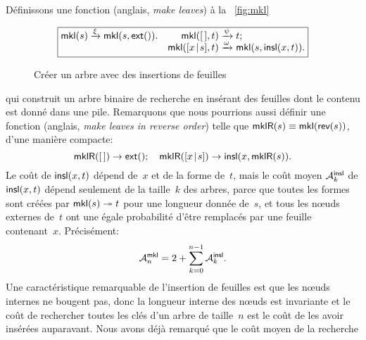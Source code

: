 \hspace*{-3pt} Définissons une fonction 
 (anglais, \emph{make leaves}) à la
\fig~\vref{fig:mkl}
\begin{figure}
\begin{equation*}
\boxed{
\begin{array}{@{}r@{\;}l@{\;}lr@{\;}l@{\;}l@{}}
  \fun{mkl}(s) & \xrightarrow{\smash{\xi}} & \fun{mkl}(s,\fun{ext}()).
& \fun{mkl}(\el,t) & \xrightarrow{\smash{\psi}} & t;\\
& & & \fun{mkl}(\cons{x}{s},t) & \xrightarrow{\smash{\omega}} & \fun{mkl}(s,\fun{insl}(x,t)).
\end{array}}
\end{equation*}
\caption{Créer un arbre avec des insertions de feuilles\label{fig:mkl}}
\end{figure}
qui construit un arbre binaire de recherche en insérant des feuilles
dont le contenu est donné dans une pile. Remarquons que nous pourrions
aussi définir une fonction 
(anglais, \emph{make leaves in reverse order}) telle que
\(\fun{mklR}(s) \equiv \fun{mkl}(\fun{rev}(s))\), d'une manière
compacte:
\begin{equation}
  \fun{mklR}(\el) \rightarrow \fun{ext}();
  \quad
  \fun{mklR}(\cons{x}{s}) \rightarrow \fun{insl}(x,\fun{mklR}(s)).
\label{eq_mklR}
\end{equation}
Le coût de \(\fun{insl}(x,t)\) dépend de~\(x\) et de la forme
de~\(t\), mais le coût moyen
\(\M{\fun{insl}}{k}\) de
\(\fun{insl}(x,t)\) dépend seulement de la taille~\(k\) des arbres,
parce que toutes les formes sont créées par \(\fun{mkl}(s)
\twoheadrightarrow t\) pour une longueur donnée de~\(s\), et tous les
n{\oe}uds externes de~\(t\) ont une égale probabilité d'être remplacés
par une feuille contenant~\(x\). Précisément:
\begin{equation}
\abovedisplayskip=2pt
\abovedisplayshortskip=2pt
\belowdisplayskip=4pt
\M{\fun{mkl}}{n} = 2 + \sum_{k=0}^{n-1}\M{\fun{insl}}{k}.
\label{eq_Mmkl0}
\end{equation}
Une caractéristique remarquable de l'insertion de feuilles est que les
n{\oe}uds internes ne bougent pas, donc la longueur
interne des
n{\oe}uds est invariante et le coût de rechercher toutes les clés d'un
arbre de taille~\(n\) est le coût de les avoir insérées
auparavant. Nous avons déjà remarqué que le coût moyen de la recherche
